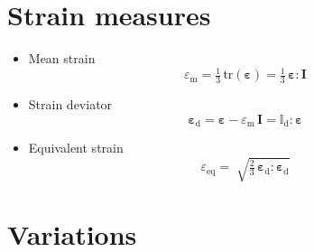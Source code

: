 \documentclass[namecite, fleqn]{goose-article}
\begin{document}
\section{Strain measures}
\label{sec:ap:strain}

\begin{itemize}

    \item Mean strain
    \begin{equation}
        \varepsilon_\mathrm{m}
        = \tfrac{1}{3} \, \mathrm{tr} ( \bm{\varepsilon} )
        = \tfrac{1}{3} \, \bm{\varepsilon} : \bm{I}
    \end{equation}
    \item Strain deviator
    \begin{equation}
        \bm{\varepsilon}_\mathrm{d}
        = \bm{\varepsilon} - \varepsilon_\mathrm{m} \, \bm{I}
        = \mathbb{I}_\mathrm{d} : \bm{\varepsilon}
    \end{equation}
    \item Equivalent strain
    \begin{equation}
        \varepsilon_\mathrm{eq}
        = \; \sqrt{
            \tfrac{2}{3} \, \bm{\varepsilon}_\mathrm{d} : \bm{\varepsilon}_\mathrm{d}
        }
    \end{equation}

\end{itemize}

\section{Variations}
\label{sec:ap:variations}
\end{document}
